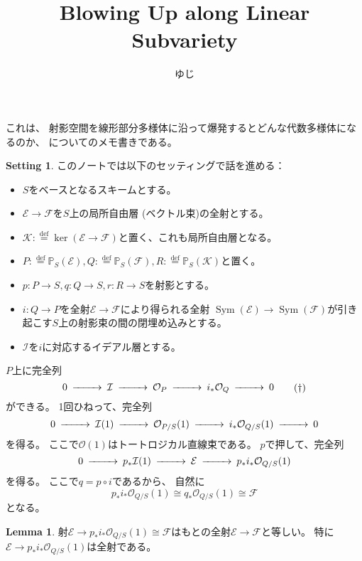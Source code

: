 \documentclass[uplatex]{jsarticle}
\title{Blowing Up along Linear Subvariety}
\author{ゆじ}
\theoremstyle{definition}
\newtheorem{lem}[lem]{Lemma}
\newtheorem*{setting*}{Setting}
\DeclareMathOperator{\Sym}{\mathrm{Sym}}
\renewcommand{\P}{\mathbb{P}}
\newcommand{\mcE}{\mathcal{E}}
\newcommand{\mcF}{\mathcal{F}}
\newcommand{\mcI}{\mathcal{I}}
\newcommand{\mcK}{\mathcal{K}}
\newcommand{\mcO}{\mathcal{O}}
\newcommand{\OOO}{\mcO}
\newcommand{\OP}{\OOO_P}
\newcommand{\OQ}{\OOO_Q}
\newcommand{\OO}[1]{\OOO_{#1}}
\newcommand{\dfn}{:\overset{\mathrm{def}}{=}}
\begin{document}
\maketitle

これは、
射影空間を線形部分多様体に沿って爆発するとどんな代数多様体になるのか、
についてのメモ書きである。



\begin{setting*}
  このノートでは以下のセッティングで話を進める：
  \begin{itemize}
    \item
    \(S\)をベースとなるスキームとする。
    \item
    \(\mcE\to \mcF\)を\(S\)上の局所自由層 (ベクトル束)の全射とする。
    \item
    \(\mcK\dfn \ker (\mcE\to \mcF)\)と置く、これも局所自由層となる。
    \item
    \(P\dfn \P_S(\mcE), Q\dfn\P_S(\mcF), R\dfn \P_S(\mcK)\)と置く。
    \item
    \(p:P\to S, q:Q\to S, r:R\to S\)を射影とする。
    \item
    \(i:Q\to P\)を全射\(\mcE\to \mcF\)により得られる全射
    \(\Sym(\mcE)\to \Sym(\mcF)\)が引き起こす\(S\)上の射影束の間の閉埋め込みとする。
    \item
    \(\mcI\)を\(i\)に対応するイデアル層とする。
  \end{itemize}
\end{setting*}


\(P\)上に完全列
\begin{equation}\label{eq: exact ideal of Q on P}
  \begin{CD}
    0 @>>> \mcI @>>> \OP @>>> i_*\OQ @>>> 0
  \end{CD}
  \tag{\(\dagger\)}
\end{equation}
ができる。
1回ひねって、完全列
\[
\begin{CD}
  0 @>>> \mcI(1) @>>> \OO{P/S}(1) @>>> i_*\OO{Q/S}(1) @>>> 0
\end{CD}
\]
を得る。
ここで\(\OOO(1)\)はトートロジカル直線束である。
\(p\)で押して、完全列
\[
\begin{CD}
  0 @>>> p_*\mcI(1) @>>> \mcE @>>> p_*i_*\OO{Q/S}(1)
\end{CD}
\]
を得る。
ここで\(q=p\circ i\)であるから、
自然に
\[
p_*i_*\OO{Q/S}(1) \cong q_*\OO{Q/S}(1) \cong \mcF
\]
となる。

\begin{lem}
  射\(\mcE\to p_*i_*\OO{Q/S}(1)\cong \mcF\)はもとの全射\(\mcE\to \mcF\)と等しい。
  特に\(\mcE\to p_*i_*\OO{Q/S}(1)\)は全射である。
\end{lem}
\end{document}
